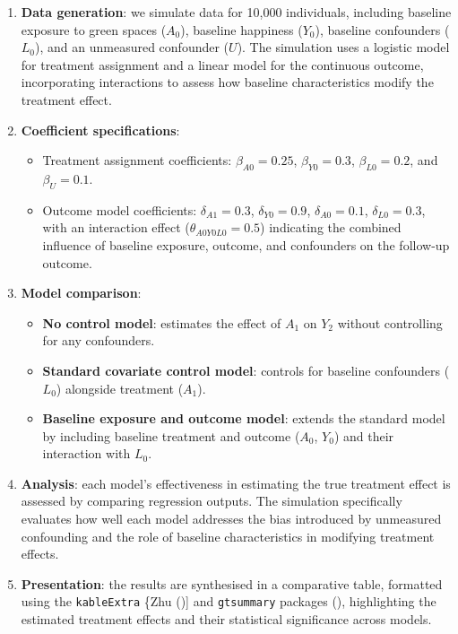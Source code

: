 \documentclass[
  singlecolumn]{article}
\providecommand{\tightlist}{%
  \setlength{\itemsep}{0pt}\setlength{\parskip}{0pt}}\usepackage{longtable,booktabs,array}
\begin{document}
\begin{enumerate}
\def\labelenumi{\arabic{enumi}.}
\item
  \textbf{Data generation}: we simulate data for 10,000 individuals,
  including baseline exposure to green spaces (\(A_0\)), baseline
  happiness (\(Y_0\)), baseline confounders (\(L_0\)), and an unmeasured
  confounder (\(U\)). The simulation uses a logistic model for treatment
  assignment and a linear model for the continuous outcome,
  incorporating interactions to assess how baseline characteristics
  modify the treatment effect.
\item
  \textbf{Coefficient specifications}:

  \begin{itemize}
  \tightlist
  \item
    Treatment assignment coefficients: \(\beta_{A0} = 0.25\),
    \(\beta_{Y0} = 0.3\), \(\beta_{L0} = 0.2\), and \(\beta_{U} = 0.1\).
  \item
    Outcome model coefficients: \(\delta_{A1} = 0.3\),
    \(\delta_{Y0} = 0.9\), \(\delta_{A0} = 0.1\), \(\delta_{L0} = 0.3\),
    with an interaction effect (\(\theta_{A0Y0L0} = 0.5\)) indicating
    the combined influence of baseline exposure, outcome, and
    confounders on the follow-up outcome.
  \end{itemize}
\item
  \textbf{Model comparison}:

  \begin{itemize}
  \tightlist
  \item
    \textbf{No control model}: estimates the effect of \(A_1\) on
    \(Y_2\) without controlling for any confounders.
  \item
    \textbf{Standard covariate control model}: controls for baseline
    confounders (\(L_0\)) alongside treatment (\(A_1\)).
  \item
    \textbf{Baseline exposure and outcome model}: extends the standard
    model by including baseline treatment and outcome (\(A_0\), \(Y_0\))
    and their interaction with \(L_0\).
  \end{itemize}
\item
  \textbf{Analysis}: each model's effectiveness in estimating the true
  treatment effect is assessed by comparing regression outputs. The
  simulation specifically evaluates how well each model addresses the
  bias introduced by unmeasured confounding and the role of baseline
  characteristics in modifying treatment effects.
\item
  \textbf{Presentation}: the results are synthesised in a comparative
  table, formatted using the \texttt{kableExtra} \{Zhu
  (){]} and \texttt{gtsummary}
  packages (),
  highlighting the estimated treatment effects and their statistical
  significance across models.
\end{enumerate}
\end{document}
